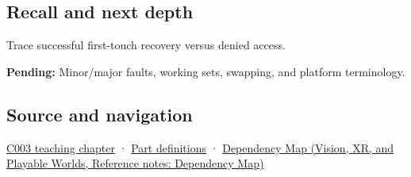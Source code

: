 \subsection{Recall and next depth}\label{appendix-cc0909a7ef14-recall-and-next-depth}

Trace successful first-touch recovery versus denied access.

\textbf{Pending:} Minor/major faults, working sets, swapping, and platform terminology.

\subsection{Source and navigation}\label{appendix-cc0909a7ef14-source-and-navigation}

\hyperref[01-foundations-i-ch002-where-the-bytes-live]{C003 teaching chapter} · \hyperref[appendix-fd090d982a15-m003---parts-41-60]{Part definitions} · \href{../07-Vision-XR-and-Playable-Worlds/main.pdf\#nameddest=appendix-4ad47bdd269a}{Dependency Map (Vision, XR, and Playable Worlds, Reference notes: Dependency Map)}
